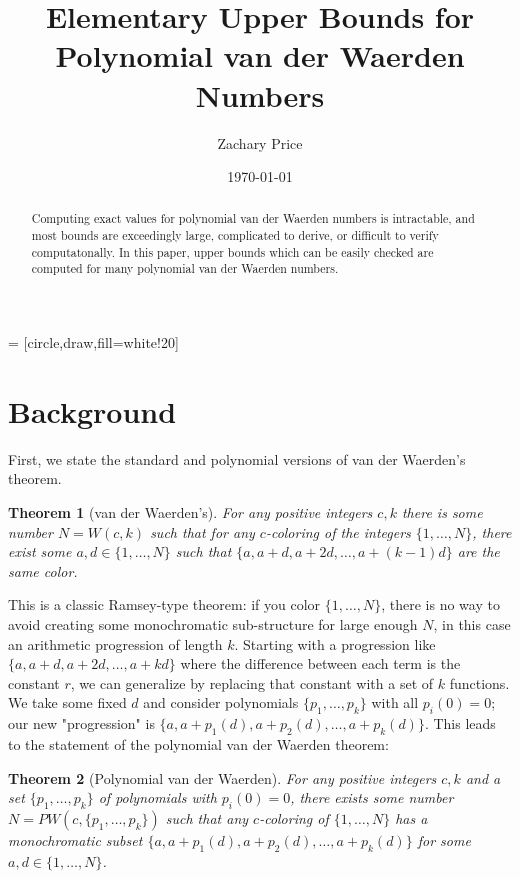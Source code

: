 \documentclass[a4paper]{amsproc}
\title{Elementary Upper Bounds for Polynomial van der Waerden Numbers}
\author[Price]{Zachary Price}
\date{\today}
\theoremstyle{plain}
\theoremstyle{named}
\newtheorem*{namedtheorem}{Theorem}
\begin{document}
 = [circle,draw,fill=white!20]

\vspace{18mm} \setcounter{page}{1} \thispagestyle{empty}

\begin{abstract}
  Computing exact values for polynomial van der Waerden numbers is intractable,
  and most bounds are exceedingly large, complicated to derive, or difficult to verify computatonally.
  In this paper, upper bounds which can be easily checked are computed for many polynomial van der Waerden numbers.
\end{abstract}

\maketitle

\section{Background}

First, we state the standard and polynomial versions of van der Waerden's theorem.

\begin{namedtheorem}[van der Waerden's]
  For any positive integers $c,k$ there is some number $N=W(c,k)$ such that for any $c$-coloring of the integers $\{1,\ldots,N\}$, there
  exist some $a,d\in \{1,\ldots,N\}$ such that $\{a, a+d, a+2d, \ldots, a+(k-1)d\}$ are the same color.
\end{namedtheorem}

This is a classic Ramsey-type theorem: if you color $\{1,\ldots,N\}$, there is no way to avoid creating some monochromatic sub-structure for large enough $N$, in this case an arithmetic progression of length $k$.
Starting with a progression like $\{a, a+d, a+2d,\ldots, a+kd\}$ where the difference between each term is the constant $r$, we can generalize by replacing that constant with a set of $k$ functions.
We take some fixed $d$ and consider polynomials $\{p_1,\ldots,p_k\}$ with all $p_i(0)=0$; our new "progression" is $\{a, a+p_1(d), a+p_2(d),\ldots, a+p_k(d)\}$.
This leads to the statement of the polynomial van der Waerden theorem:

\begin{namedtheorem}[Polynomial van der Waerden]
  For any positive integers $c,k$ and a set $\{p_1,\ldots,p_k\}$ of polynomials with $p_i(0)=0$, there exists some number $N=PW(c,\{p_1,\ldots,p_k\})$ such that any $c$-coloring of $\{1,\ldots,N\}$ has a monochromatic subset ${\{a, a+p_1(d), a+p_2(d),\ldots, a+p_k(d)\}}$ for some $a,d\in\{1,\ldots,N\}$.
\end{namedtheorem}
\end{document}
